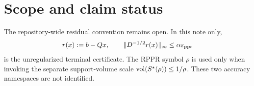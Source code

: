 \section{Scope and claim status}
\label{sec:scope}



The repository-wide residual convention remains open.  In this note only,
\begin{equation}
 r(x):=b-Qx,
 \qquad
 \lVert D^{-1/2}r(x)\rVert_\infty\leq\alpha\varepsilon_{\mathrm{ppr}}
 \label{eq:note-gate}
\end{equation}
is the unregularized terminal certificate.  The RPPR symbol $\rho$ is used
only when invoking the separate support-volume scale
$\operatorname{vol}(S^\star(\rho))\leq1/\rho$.  These two accuracy namespaces are not
identified.

